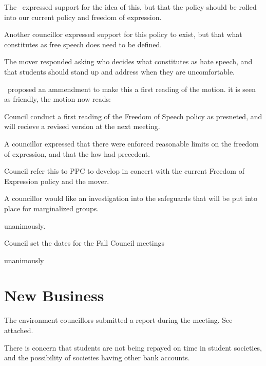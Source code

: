 \begin{motion}
\begin{motion}
    The \pres\ expressed support for the idea of this, but that the policy 
    should be rolled into our current policy and freedom of expression. 

    Another councillor expressed support for this policy to exist, but that
    what constitutes as free speech does need to be defined. 

    The mover responded asking who decides what constitutes as hate speech, 
    and that students should stand up and address when they are uncomfortable. 

    \tristan\ proposed an ammendment to make this a first reading of the motion. 
    it is seen as friendly, the motion now reads:

    \birt Council conduct a first reading of the Freedom of Speech policy
    as presneted, and will recieve a revised version at the next meeting. 

    A councillor expressed that there were enforced reasonable limits on the
    freedom of expression, and that the law had precedent. 

    \birt Council refer this to PPC to develop in concert with the current
    Freedom of Expression policy and the mover. 
    \movers{\seneca}{\brian}

    A councillor would like an investigation into the safeguards that will be
    put into place for marginalized groups. 

    \caries unanimously.  
\end{motion}

\begin{motion}
    \birt Council set the dates for the Fall Council meetings

    \movers{\antonio}{\brian}

    \caries unanimously
\end{motion}


\section*{New Business}

\begin{information}

    The environment councillors submitted a report during the meeting. See
    attached. 

    There is concern that students are not being repayed on time in student 
    societies, and the possibility of societies having other bank accounts. 


\end{information}
\end{motion}
